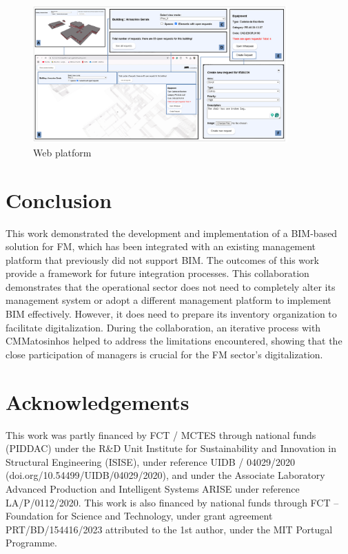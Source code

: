 \documentclass[a4paper, 10pt, twocolumn, twoside]{article}
\begin{document}
\begin{figure}[!htb]
    \centering
    \includegraphics[width=0.87\textwidth]{Images/plataforma.png}
    \caption{Web platform}
    \label{fig_plataforma}
\end{figure}

\section{Conclusion}
\label{sec:conclusion}

This work demonstrated the development and implementation of a BIM-based solution for FM, which has been integrated with an existing management platform that previously did not support BIM. The outcomes of this work provide a framework for future integration processes. This collaboration demonstrates that the operational sector does not need to completely alter its management system or adopt a different management platform to implement BIM effectively. However, it does need to prepare its inventory organization to facilitate digitalization. During the collaboration, an iterative process with CMMatosinhos helped to address the limitations encountered, showing that the close participation of managers is crucial for the FM sector's digitalization.

\section{Acknowledgements}
\label{sec:acknowledgements}

This work was partly financed by FCT / MCTES through national funds (PIDDAC) under the R\&D Unit Institute for Sustainability and Innovation in Structural Engineering (ISISE), under reference UIDB / 04029/2020 (doi.org/10.54499/UIDB/04029/2020), and under the Associate Laboratory Advanced Production and Intelligent Systems ARISE under reference LA/P/0112/2020. This work is also financed by national funds through FCT – Foundation for Science and Technology, under grant agreement PRT/BD/154416/2023 attributed to the 1st author, under the MIT Portugal Programme.


\end{document}
